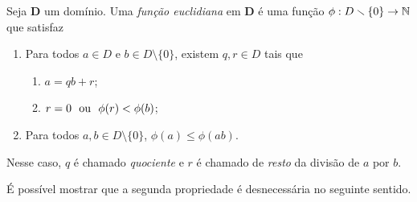 \begin{definition}
Seja $\bm D$ um domínio. Uma \emph{função euclidiana} em $\bm D$ é uma função $\phi: D \smallsetminus \{0\} \to \mathbb{N}$ que satisfaz
	\begin{enumerate}
	\item Para todos $a \in D$ e $b \in D \setminus \{0\}$, existem $q,r \in D$ tais que
		\begin{enumerate}
		\item $a=qb+r$;
		\item $r=0 \text{\ \ ou\ \ } \phi(r)<\phi(b)$;
		\end{enumerate}
	\item Para todos $a,b \in D \setminus \{0\}$, $\phi(a) \leq \phi(ab)$.
	\end{enumerate}
	Nesse caso, $q$ é chamado \emph{quociente} e $r$ é chamado de \emph{resto} da divisão de $a$ por $b$.
\end{definition}

É possível mostrar que a segunda propriedade é desnecessária no seguinte sentido.

